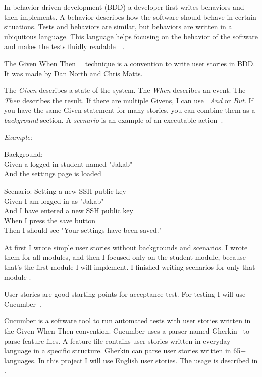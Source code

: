 In behavior-driven development (BDD) a developer first writes behaviors and then implements. A behavior describes how the software should behave in certain situations. Tests and behaviors are similar, but behaviors are written in a ubiquitous language. This language helps focusing on the behavior of the software and makes the tests fluidly readable~\cite{given-when-then-article2}~\cite{given-when-then-article3}. 

The Given When Then~\cite{given-when-then-cucumber}~\cite{given-when-then-article} technique is a convention to write user stories in BDD. It was made by Dan North and Chris Matts.

The \emph{Given} describes a state of the system. The \emph{When} describes an event. The \emph{Then} describes the result. If there are multiple Givens, I can use ~\emph{And} or \emph{But}. If you have the same Given statement for many stories, you can combine them as a \emph{background} section. A \emph{scenario} is an example of an executable action~\cite{Cucumber-scenario}. 

\emph{Example:}

Background:\\ \hspace*{1cm}
Given a logged in student named "Jakab"\\ \hspace*{1cm}
And the settings page is loaded

Scenario: Setting a new SSH public key\\ \hspace*{1cm}
Given I am logged in as "Jakab"\\ \hspace*{1cm}
And I have entered a new SSH public key\\ \hspace*{1cm}
When I press the save button\\ \hspace*{1cm}
Then I should see "Your settings have been saved."

At first I wrote simple user stories without backgrounds and scenarios. I wrote them for all modules, and then I focused only on the student module, because that's the first module I will implement. I finished writing scenarios for only that module .

\label{spec-cucumber}
User stories are good starting points for acceptance test. For testing I will use Cucumber~\cite{Cucumber}. 

Cucumber is a software tool to run automated tests with user stories written in the Given When Then convention. Cucumber uses a parser named Gherkin~\cite{Cucumber-gherkin} to parse feature files. 
A feature file contains user stories written in everyday language in a specific structure. Gherkin can parse user stories written in 65+ languages. In this project I will use English user stories. The usage is described in .


